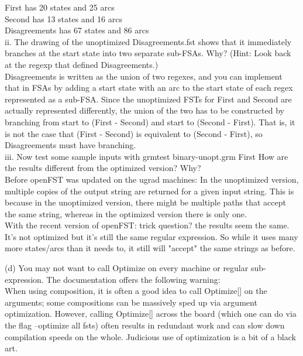 \documentclass[11pt]{article} %
\begin{document}
First has 20 states and 25 arcs\\
Second has 13 states and 16 arcs\\
Disagreements has 67 states and 86 arcs\\


ii. The drawing of the unoptimized Disagreements.fst shows that it immediately branches at the start state into two separate sub-FSAs. Why? (Hint: Look back at the regexp that defined Disagreements.) \\

Disagreements is written as the union of two regexes, and you can implement that in FSAs by adding a start state with an arc to the start state of each regex represented as a sub-FSA. Since the unoptimized FSTs for First and Second are actually represented differently, the union of the two has to be constructed by branching from start to (First - Second) and start to (Second - First). That is, it is not the case that (First - Second) is equivalent to (Second - First), so Disagreements must have branching.\\


iii. Now test some sample inputs with grmtest binary-unopt.grm First How are the results different from the optimized version? Why?\\


Before openFST was updated on the ugrad machines: In the unoptimized version, multiple copies of the output string are returned for a given input string. This is because in the unoptimized version, there might be multiple paths that accept the same string, whereas in the optimized version there is only one.\\


With the recent version of openFST: trick question? the results seem the same. It's not optimized but it's still the same regular expression. So while it uses many more states/arcs than it needs to, it still will "accept" the same strings as before.\\

\newpage

(d) You may not want to call Optimize on every machine or regular sub-expression. The documentation offers the following warning: \\


When using composition, it is often a good idea to call Optimize[] on the arguments; some compositions can be massively sped up via argument optimization. However, calling Optimize[] across the board (which one can do via the flag --optimize all fsts) often results in redundant work and can slow down compilation speeds on the whole. Judicious use of optimization is a bit of a black art. \\
\end{document}
